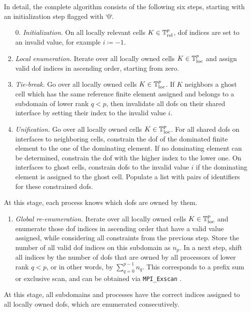 In detail, the complete algorithm consists of the following six steps, starting with an initialization step flagged with `0`.
\begin{enumerate}
  \item[0.] \textit{Initialization.}
  On all locally relevant cells $K \in \mathbb{T}^p_{\text{rel}}$, \gls{dof} indices are set to an invalid value, for example $i \coloneqq -1$.
  \item \textit{Local enumeration.}
  Iterate over all locally owned cells $K \in \mathbb{T}^p_{\text{loc}}$ and assign valid \gls{dof} indices in ascending order, starting from zero.
  \item \textit{Tie-break.}
  Go over all locally owned cells $K \in \mathbb{T}^p_{\text{loc}}$. If $K$ neighbors a ghost cell which has the same reference finite element assigned and belongs to a subdomain of lower rank $q < p$, then invalidate all \glspl{dof} on their shared interface by setting their index to the invalid value $i$.
  \item \textit{Unification.}
  Go over all locally owned cells $K \in \mathbb{T}^p_{\text{loc}}$. For all shared \glspl{dof} on interfaces to neighboring cells, constrain the \gls{dof} of the dominated finite element to the one of the dominating element. If no dominating element can be determined, constrain the \gls{dof} with the higher index to the lower one. On interfaces to ghost cells, constrain \glspl{dof} to the invalid value $i$ if the dominating element is assigned to the ghost cell.
  Populate a list with pairs of identifiers for these constrained \glspl{dof}.
\end{enumerate}
At this stage, each process knows which \glspl{dof} are owned by them.
\begin{enumerate}[resume]
  \item \textit{Global re-enumeration.}
  Iterate over all locally owned cells $K \in \mathbb{T}^p_{\text{loc}}$
  and enumerate those \gls{dof} indices in ascending order that have a valid value assigned, while considering all constraints from the previous step. Store the number of all valid \gls{dof} indices on this subdomain as $n_p$. In a next step, shift all indices by the number of \glspl{dof} that are owned by all processors of lower rank $q < p$, or in other words, by $\sum_{q=0}^{p-1} n_q$. This corresponds to a prefix sum or exclusive scan, and can be obtained via \texttt{MPI\_Exscan} \textcite{mpi31}.
\end{enumerate}
At this stage, all subdomains and processes have the correct indices assigned to all locally owned \glspl{dof}, which are enumerated consecutively.
